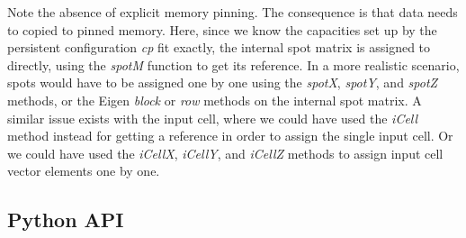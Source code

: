 \documentclass[a4paper,10pt]{article}
\begin{document}
%
Note the absence of explicit memory pinning. The consequence is that data needs to copied to pinned memory. Here, since we know the capacities set up by the persistent configuration \emph{cp} fit exactly, the internal spot matrix is assigned to directly, using the \emph{spotM} function to get its reference. In a more realistic scenario, spots would have to be assigned one by one using the \emph{spotX}, \emph{spotY}, and \emph{spotZ} methods, or the Eigen \emph{block} or \emph{row} methods on the internal spot matrix. A similar issue exists with the input cell, where we could have used the \emph{iCell} method instead for getting a reference in order to assign the single input cell. Or we could have used the \emph{iCellX}, \emph{iCellY}, and \emph{iCellZ} methods to assign input cell vector elements one by one.

\subsection{Python API}
\lstset{language=Python}
\end{document}
